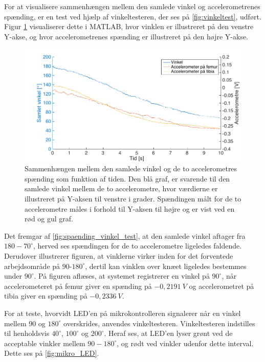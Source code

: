 For at visualisere sammenhængen mellem den samlede vinkel og accelerometrenes spænding, er en test ved hjælp af vinkeltesteren, der ses på \autoref{fig:vinkeltest}, udført.  
Figur \ref{fig:spaending_vinkel_test} visualiserer dette i MATLAB, hvor vinklen er illustreret på den venstre Y-akse, og hvor accelerometrenes spænding er illustreret på den højre Y-akse.

\begin{figure}[H]
\centering
\includegraphics[width=1\textwidth]{figures/spaending_vinkel_test}
\caption{Sammenhængen mellem den samlede vinkel og de to accelerometres spænding som funktion af tiden. Den blå graf, er svarende til den samlede vinkel mellem de to accelerometre, hvor værdierne er illustreret på Y-aksen til venstre i grader. Spændingen målt for de to accelerometre måles i forhold til Y-aksen til højre og er vist ved en rød og gul graf.}
\label{fig:spaending_vinkel_test}
\end{figure}

\noindent
Det fremgar af \autoref{fig:spaending_vinkel_test}, at den samlede vinkel aftager fra $180-70^{\circ}$, herved ses spændingen for de to accelerometre ligeledes faldende.
Derudover illustrerer figuren, at vinklerne virker inden for det forventede arbejdsområde på $90$-$180^{\circ}$, dertil kan vinklen over knæet ligeledes bestemmes under $90^{\circ}$. 
På figuren aflæses, at systemet registrerer en vinkel på $90^{\circ}$, når  accelerometeret på femur giver en spænding på $-0,2191~V$ og accelerometret på tibia giver en spænding på $-0,2336~V$.


For at teste, hvorvidt LED'en på mikrokontrolleren signalerer når en vinkel mellem $90$ og $180^{\circ}$ overskrides, anvendes vinkeltesteren. Vinkeltesteren indstilles til henholdsvis $40^{\circ}$, $100^{\circ}$ og $200^{\circ}$. 
Heraf ses, at LED'en lyser grønt ved de acceptable vinkler mellem $90-180^{\circ}$, og rødt ved vinkler udenfor dette interval. Dette ses på \autoref{fig:mikro_LED}.

